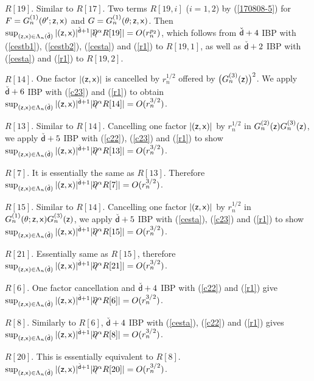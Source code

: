 \documentclass[a4paper]{article}
\numberwithin{equation}{section}
\def\csfd{{\check{\sfd}}}
\newcommand{\sfx}{{\sf x}}
\newcommand{\sfz}{{\sf z}}
\def\sfd{{\sf d}}
\def\partialbs{\backslash\!\!\!\partial}
\begin{document}
{\im $R[19]$. Similar to $R[17]$. 
Two terms $R[19,i]$ ($i=1,2$) by (\ref{170808-5}) 
for $F=G^{(1)}_n(\theta';\sfz,\sfx)$ and $G=G^{(1)}_n(\theta;\sfz,\sfx)$. 
Then 
$\sup_{(\sfz,\sfx)\in\Lambda_n(\csfd)}|(\sfz,\sfx)|^{\csfd+1}|\partialbs^\alpha R[19]|=O(r_n^{p_2})$, which follows from 
$\csfd+4$ IBP with (\ref{cestb1}), (\ref{cestb2}), (\ref{cesta}) and (\ref{r1}) to $R[19,1]$, as well as  
$\csfd+2$ IBP with (\ref{cesta}) and (\ref{r1}) to $R[19,2]$. 

\im $R[14]$. One factor $|(\sfz,\sfx)|$ is cancelled by $r_n^{1/2}$ offered by $\big(G^{(3)}_n(\sfz)\big)^2$. 
We apply $\csfd+6$ IBP with (\ref{c23}) and (\ref{r1})
to obtain $\sup_{(\sfz,\sfx)\in\Lambda_n(\csfd)}|(\sfz,\sfx)|^{\csfd+1}|\partialbs^\alpha R[14]|=O(r_n^{3/2})$. 

\im $R[13]$. Similar to $R[14]$. 
Cancelling one factor $|(\sfz,\sfx)|$ by $r_n^{1/2}$ in $G^{(2)}_n(\sfz)G^{(3)}_n(\sfz)$, 
we apply $\csfd+5$ IBP with (\ref{c22}), (\ref{c23}) and (\ref{r1}) 
to show $\sup_{(\sfz,\sfx)\in\Lambda_n(\csfd)}|(\sfz,\sfx)|^{\csfd+1}|\partialbs^\alpha R[13]|=O(r_n^{3/2})$. 

\im $R[7]$. It is essentially the same as $R[13]$. Therefore 
$\sup_{(\sfz,\sfx)\in\Lambda_n(\csfd)}|(\sfz,\sfx)|^{\csfd+1}|\partialbs^\alpha R[7]|=O(r_n^{3/2})$. 

\im $R[15]$. Similar to $R[14]$. 
Cancelling one factor $|(\sfz,\sfx)|$ by $r_n^{1/2}$ in $G^{(1)}_n(\theta;\sfz,\sfx)G^{(3)}_n(\sfz)$, 
we apply $\csfd+5$ IBP with (\ref{cesta}), (\ref{c23}) and (\ref{r1}) 
to show $\sup_{(\sfz,\sfx)\in\Lambda_n(\csfd)}|(\sfz,\sfx)|^{\csfd+1}|\partialbs^\alpha R[15]|=O(r_n^{3/2})$. 

\im $R[21]$. Essentially same as $R[15]$, therefore 
$\sup_{(\sfz,\sfx)\in\Lambda_n(\csfd)}|(\sfz,\sfx)|^{\csfd+1}|\partialbs^\alpha R[21]|=O(r_n^{3/2})$. 

\im $R[6]$. One factor cancellation and $\csfd+4$ IBP with (\ref{c22}) and (\ref{r1}) 
give $\sup_{(\sfz,\sfx)\in\Lambda_n(\csfd)}|(\sfz,\sfx)|^{\csfd+1}|\partialbs^\alpha R[6]|=O(r_n^{3/2})$. 

\im $R[8]$. Similarly to $R[6]$, 
$\csfd+4$ IBP with (\ref{cesta}), (\ref{c22}) and (\ref{r1}) gives 
$\sup_{(\sfz,\sfx)\in\Lambda_n(\csfd)}|(\sfz,\sfx)|^{\csfd+1}|\partialbs^\alpha R[8]|=O(r_n^{3/2})$. 

\im $R[20]$. This is essentially equivalent to $R[8]$. 
$\sup_{(\sfz,\sfx)\in\Lambda_n(\csfd)}|(\sfz,\sfx)|^{\csfd+1}|\partialbs^\alpha R[20]|=O(r_n^{3/2})$. 

}
\end{document}
